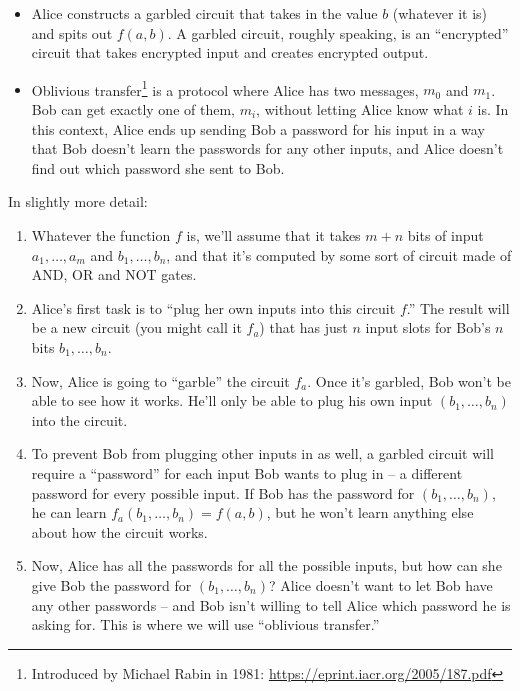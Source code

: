\begin{itemize}
\item Alice constructs a \alert{garbled circuit} that takes in the value
  $b$ (whatever it is) and spits out $f(a,b)$.
  A garbled circuit, roughly speaking, is an ``encrypted'' circuit that takes
  encrypted input and creates encrypted output.
\item \alert{Oblivious transfer}\footnote{Introduced by Michael Rabin in 1981: \url{https://eprint.iacr.org/2005/187.pdf}}
is a protocol where Alice has two
  messages, $m_{0}$ and $m_{1}$. Bob can get exactly one of them,
  $m_{i}$, without letting Alice know what $i$ is. In this context,
  Alice ends up sending Bob a password for his input in a way that Bob
  doesn't learn the passwords for any other inputs, and Alice doesn't
  find out which password she sent to Bob.
\end{itemize}

In slightly more detail:
\begin{enumerate}
\item
  Whatever the function $f$ is, we'll assume that it takes $m + n$
  bits of input $a_{1},\ldots,a_{m}$ and $b_{1},\ldots,b_{n}$, and
  that it's computed by some sort of circuit made of AND, OR and NOT
  gates.
\item
  Alice's first task is to ``plug her own inputs into this circuit
  $f$.'' The result will be a new circuit (you might call it
  $f_{a}$) that has just $n$ input slots for Bob's $n$ bits
  $b_{1},\ldots,b_{n}$.
\item
  Now, Alice is going to ``garble'' the circuit $f_{a}$. Once it's
  garbled, Bob won't be able to see how it works. He'll only be
  able to plug his own input $( b_{1},\ldots,b_{n})$ into
  the circuit.
\item
  To prevent Bob from plugging other inputs in as well, a garbled
  circuit will require a ``password'' for each input Bob wants to plug
  in -- a different password for every possible input. If Bob has the
  password for $( b_{1},\ldots,b_{n})$, he can learn
  $f_a( b_{1},\ldots,b_{n}) = f(a,b)$, but he won't
  learn anything else about how the circuit works.
\item
  Now, Alice has all the passwords for all the possible inputs, but how
  can she give Bob the password for
  $( b_{1},\ldots,b_{n})$? Alice doesn't want to let Bob
  have any other passwords -- and Bob isn't willing to tell Alice which
  password he is asking for. This is where we will use ``oblivious
  transfer.''
\end{enumerate}

